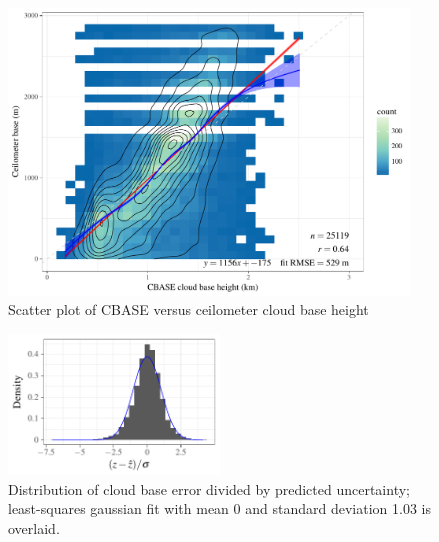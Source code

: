 \documentclass[amt,manuscript]{copernicus}\usepackage[]{graphicx}\usepackage[]{color}
\newenvironment{knitrout}{}{} %
\begin{document}
\begin{figure}
  \centering
\begin{knitrout}
\color{fgcolor}

{\centering \includegraphics[width=0.95\textwidth]{figure/method-combo-plot-1} 

}



\end{knitrout}
  \caption{Scatter plot of CBASE versus ceilometer cloud base height}
  \label{fig:eval}
\end{figure}

\begin{figure}
  \centering
\begin{knitrout}
\color{fgcolor}

{\centering \includegraphics[width=0.5\textwidth]{figure/method-combo-eval-pull-1} 

}



\end{knitrout}
  \caption{Distribution of cloud base error divided by predicted uncertainty;
    least-squares gaussian fit with mean 0 and standard deviation 1.03 is overlaid.}
  \label{fig:pull}
\end{figure}
\end{document}
